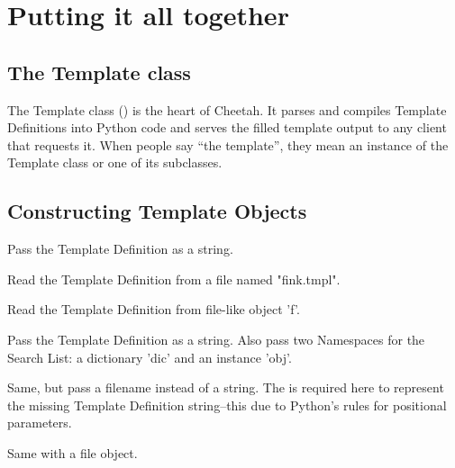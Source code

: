 \section{Putting it all together}
\label{puttingItTogether}

\subsection{The Template class}
\label{puttingItTogether.TO}
The Template class () is the heart of Cheetah.
It parses and compiles Template Definitions into Python code and serves the
filled template output to any client that requests it.  When people say ``the
template'', they mean an instance of the Template class or one of its
subclasses.


\subsection{Constructing Template Objects}

\begin{description}

\item{}
     Pass the Template Definition as a string.

\item{}
     Read the Template Definition from a file named "fink.tmpl".
     
\item{}
     Read the Template Definition from file-like object 'f'.
     
\item{}
     Pass the Template Definition as a string.  Also pass two Namespaces for the
     Search List: a dictionary 'dic' and an instance 'obj'.
     
\item{}
     Same, but pass a filename instead of a string.  The  is required
     here to represent the missing Template Definition string--this due to
     Python's rules for positional parameters.
     
\item{}
     Same with a file object.

\end{description}


